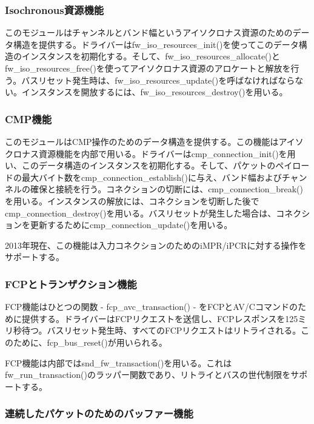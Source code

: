\documentclass[onecolumn]{jarticle}
\begin{document}
\subsubsection{Isochronous資源機能}

このモジュールはチャンネルとバンド幅というアイソクロナス資源のためのデータ構造を提供する。ドライバーはfw\_iso\_resources\_init()を使ってこのデータ構造のインスタンスを初期化する。そして、fw\_iso\_resources\_allocate()とfw\_iso\_resources\_free()を使ってアイソクロナス資源のアロケートと解放を行う。バスリセット発生時は、fw\_iso\_resources\_update()を呼ばなければならない。インスタンスを開放するには、fw\_iso\_resources\_destroy()を用いる。

\subsubsection{CMP機能}

このモジュールはCMP操作のためのデータ構造を提供する。この機能はアイソクロナス資源機能を内部で用いる。ドライバーはcmp\_connection\_init()を用い、このデータ構造のインスタンスを初期化する。そして、パケットのペイロードの最大バイト数をcmp\_connection\_establish()に与え、バンド幅およびチャンネルの確保と接続を行う。コネクションの切断には、cmp\_connection\_break()を用いる。インスタンスの解放には、コネクションを切断した後でcmp\_connection\_destroy()を用いる。バスリセットが発生した場合は、コネクションを更新するためにcmp\_connection\_update()を用いる。

2013年現在、この機能は入力コネクションのためのiMPR/iPCRに対する操作をサポートする。

\subsubsection{FCPとトランザクション機能}

FCP機能はひとつの関数 - fcp\_avc\_transaction() - をFCPとAV/Cコマンドのために提供する。ドライバーはFCPリクエストを送信し、FCPレスポンスを125ミリ秒待つ。バスリセット発生時、すべてのFCPリクエストはリトライされる。このために、fcp\_bus\_reset()が用いられる。

FCP機能は内部ではsnd\_fw\_transaction()を用いる。これはfw\_run\_transaction()のラッパー関数であり、リトライとバスの世代制限をサポートする。


\subsubsection{連続したパケットのためのバッファー機能}
\end{document}
